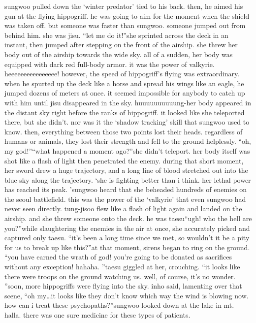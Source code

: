 sungwoo pulled down the ‘winter predator’ tied to his back.
 then, he aimed his gun at the flying hippogriff.
 he was going to aim for the moment when the shield was taken off.
but someone was faster than sungwoo.
 someone jumped out from behind him.
 she was jisu.
“let me do it!”she sprinted across the deck in an instant, then jumped after stepping on the front of the airship.
 she threw her body out of the airship towards the wide sky.
all of a sudden, her body was equipped with dark red full-body armor.
 it was the power of valkyrie.
heeeeeeeeeeeeeeee!
however, the speed of hippogriff’s flying was extraordinary.
 when he spurted up the deck like a horse and spread his wings like an eagle, he jumped dozens of meters at once.
 it seemed impossible for anybody to catch up with him until jisu disappeared in the sky.
huuuuuuuuuung-her body appeared in the distant sky right before the ranks of hippogriff.
 it looked like she teleported there, but she didn’t.
 nor was it the ‘shadow tracking’ skill that sungwoo used to know.
then, everything between those two points lost their heads.
 regardless of humans or animals, they lost their strength and fell to the ground helplessly.
“oh, my god!”“what happened a moment ago?”she didn’t teleport.
 her body itself was shot like a flash of light then penetrated the enemy.
during that short moment, her sword drew a huge trajectory, and a long line of blood stretched out into the blue sky along the trajectory.
‘she is fighting better than i think.
 her lethal power has reached its peak.
’sungwoo heard that she beheaded hundreds of enemies on the seoul battlefield.
 this was the power of the ‘valkyrie’ that even sungwoo had never seen directly.
tung-jisoo flew like a flash of light again and landed on the airship.
 and she threw someone onto the deck.
 he was taesu“ugh! who the hell are you?”while slaughtering the enemies in the air at once, she accurately picked and captured only taesu.
“it’s been a long time since we met, so wouldn’t it be a pity for us to break up like this?”at that moment, sirens began to ring on the ground.
“you have earned the wrath of god! you’re going to be donated as sacrifices without any exception! hahaha.
”taesu giggled at her, crouching.
“it looks like there were troops on the ground watching us.
 well, of course, it’s no wonder.
”soon, more hippogriffs were flying into the sky.
inho said, lamenting over that scene, “oh my…it looks like they don’t know which way the wind is blowing now.
 how can i treat these psychopaths?”sungwoo looked down at the lake in mt.
 halla.
there was one sure medicine for these types of patients.
